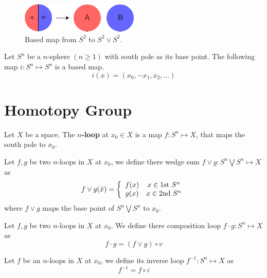 \documentclass[12pt]{book}
\begin{document}
\begin{figure}[htb!]
	\centering  
	\includegraphics[width=0.5\textwidth ]{resources/chap_bas_cstr/sphere.pdf}  
	\caption{Based map from $S^2$ to $S^2\vee S^2$.}
	\label{fig:sphere}
\end{figure}

\begin{lemma}
	Let $S^n$ be a $n$-sphere $(n\geq1)$ with south pole as its base point. The following map $i:S^n\mapsto S^n$ is a based map.
	\begin{equation}
		i(x)=(x_0,-x_1,x_2,\dots)
	\end{equation}
\end{lemma}

\section{Homotopy Group}

\begin{definition}
	Let $X$ be a space. The {\bf $n$-loop} at $x_0\in X$ is a map $f:S^n\mapsto X$, that maps the south pole to $x_0$.
\end{definition}

\begin{definition}
	Let $f,g$ be two $n$-loops in $X$ at $x_0$, we define there wedge sum $f\vee g:S^n\bigvee S^n\mapsto X$ as
	\begin{equation}
		f\vee g(\bar x)=\left\{
		\begin{array}{cc}
			f(x)& x\in {\rm 1st\ } S^n\\
			g(x)& x\in {\rm 2nd\ } S^n
		\end{array}
		\right.
	\end{equation}
	where $f\vee g$ maps the base point of $S^n\bigvee S^n$ to $x_0$.
\end{definition}

\begin{definition}
	Let $f,g$ be two $n$-loops in $X$ at $x_0$. We define there composition loop $f\cdot g:S^n\mapsto X$ as
	\begin{equation}
		f\cdot g=(f\vee g)\circ v
	\end{equation}
\end{definition}

\begin{definition}
	Let $f$ be an $n$-loops in $X$ at $x_0$, we define its inverse loop $f^{-1}:S^n\mapsto X$ as
	\begin{equation}
		f^{-1}=f\circ i
	\end{equation}
\end{definition}
\end{document}
